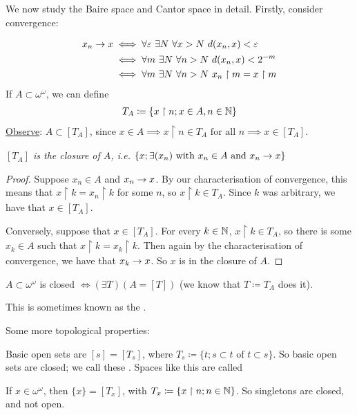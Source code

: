 \documentclass[]{article}
\newcommand{\om}{\omega}
\begin{document}

We now study the Baire space and Cantor space in detail. Firstly, consider convergence:

\begin{align*}
    x_n \ra x &\iff \forall \eps\ \exists N\ \forall x > N\ d(x_n,x) < \eps\\
    &\iff \forall m\ \exists N \ \forall n>N\ d(x_n,x) < 2^{-m} \\
    &\iff \forall m\ \exists N\ \forall n > N\ x_n\restriction m  = x\restriction m
\end{align*}
If $A\subset \om^\om$, we can define
\begin{align*}
    T_A \coloneqq \{x\restriction n; x \in A, n \in \mathbb{N}\}
\end{align*}
\underline{Observe}: $A \subset [T_A]$, since $x \in A \implies x\restriction n \in T_A\textrm{ for all }n\implies x \in [T_A]$.

\begin{remark*}[Proposition]\emph{
$[T_A]$ is the closure of $A$, \it{i.e.} $\{x;\exists(x_n)\textrm{ with }x_n\in A\textrm{ and }x_n\rightarrow x\}$
}
\end{remark*}
\begin{proof}
    Suppose $x_n \in A$ and $x_n\rightarrow x$. By our characterisation of convergence, this means that $x\restriction k = x_n\restriction k$ for some $n$, so $x\restriction k \in T_A$. Since $k$ was arbitrary, we have that $x \in [T_A]$.

    Conversely, suppose that $x \in [T_A]$. For every $k \in \mathbb{N}$, $x\restriction k \in T_A$, so there is some $x_k \in A$ such that $x\restriction k = x_k\restriction k$. Then again by the characterisation of convergence, we have that $x_k \rightarrow x$. So $x$ is in the closure of $A$.
\end{proof}
\begin{remark*}[Corollary]
    $A\subset \om^\om$ is closed $\iff (\exists T)(A = [T])$ (we know that $T\coloneqq T_A$ does it).

    This is sometimes known as the .
\end{remark*}

Some more topological properties:

Basic open sets are $[s] = [T_s]$, where $T_s \coloneqq \{t;s\subset t\textrm{ of }t\subset s\}$. So basic open sets are closed; we call these . Spaces like this are called 

If $x \in \om^\om$, then $\{x\} = [T_x]$, with $T_x \coloneqq \{x\restriction n;n\in \mathbb{N}\}$. So singletons are closed, and not open.
\end{document}
